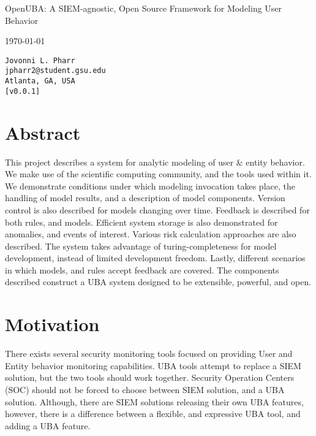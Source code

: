\documentclass[10pt, titlepage, twocolumn]{report}
\date{\today}
\date{}
\begin{document}
\begin{titlepage}

\protect\parbox{.9\textwidth}
	{\protect\centering 
		\huge OpenUBA: A SIEM-agnostic, Open Source Framework for Modeling User Behavior

	}
\begin{center}
{\LARGE
\today}
\end{center}

 
 \vfill
{
\Large
\begin{center}
\texttt{Jovonni L. Pharr} \\
\texttt{jpharr2@student.gsu.edu} \\
\texttt{Atlanta, GA, USA} \\
\texttt{[v0.0.1]} \\
\end{center}
}



\vfill
\section*{Abstract}
\noindent
This project describes a system for analytic modeling of user \& entity behavior. We make use of the scientific computing community, and the tools used within it. We demonstrate conditions under which modeling invocation takes place, the handling of model results, and a description of model components. Version control is also described for models changing over time. Feedback is described for both rules, and models. Efficient system storage is also demonstrated for anomalies, and events of interest. Various risk calculation approaches are also described. The system takes advantage of turing-completeness for model development, instead of limited development freedom. Lastly, different scenarios in which models, and rules accept feedback are covered. The components described construct a UBA system designed to be extensible, powerful, and open.
\end{titlepage}



\section{Motivation}
There exists several security monitoring tools focused on providing User and Entity behavior monitoring capabilities. UBA tools attempt to replace a SIEM solution, but the two tools should work together. Security Operation Centers (SOC) should not be forced to choose between SIEM solution, and a UBA solution. Although, there are SIEM solutions releasing their own UBA features, however, there is a difference between a flexible, and expressive UBA tool, and adding a UBA feature. 
\end{document}
